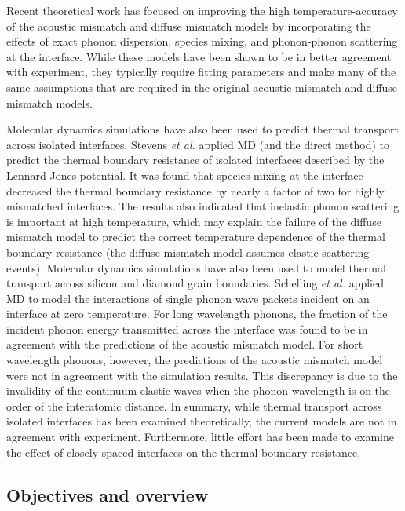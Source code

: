 \documentclass[letterpaper,12pt]{article}
\begin{document}
Recent theoretical work has focused on improving the high
temperature-accuracy of the acoustic mismatch and diffuse mismatch
models by incorporating the effects of exact phonon
dispersion,\cite{reddy2005} species mixing,\cite{beechem2007} and
phonon-phonon scattering\cite{prasher2001} at the interface. While
these models have been shown to be in better agreement with
experiment, they typically require fitting parameters and make many
of the same assumptions that are required in the original acoustic
mismatch and diffuse mismatch models.

Molecular dynamics simulations have also been used to predict
thermal transport across isolated interfaces. Stevens \textit{et
al.}\cite{stevens2007} applied MD (and the direct method) to predict
the thermal boundary resistance of isolated interfaces described by
the Lennard-Jones potential. It was found that species mixing at the
interface decreased the thermal boundary resistance by nearly a
factor of two for highly mismatched interfaces. The results also
indicated that inelastic phonon scattering is important at high
temperature, which may explain the failure of the diffuse mismatch
model to predict the correct temperature dependence of the thermal
boundary resistance (the diffuse mismatch model assumes elastic
scattering events\cite{swartz1989}). Molecular dynamics simulations
have also been used to model thermal transport across
silicon\cite{schelling2004} and diamond\cite{angadi2006} grain
boundaries. Schelling \textit{et al.}\cite{schelling2003} applied MD
to model the interactions of single phonon wave packets incident on
an interface at zero temperature. For long wavelength phonons, the
fraction of the incident phonon energy transmitted across the
interface was found to be in agreement with the predictions of the
acoustic mismatch model. For short wavelength phonons, however, the
predictions of the acoustic mismatch model were not in agreement
with the simulation results. This discrepancy is due to the
invalidity of the continuum elastic waves when the phonon wavelength
is on the order of the interatomic distance. In summary, while
thermal transport across isolated interfaces has been examined
theoretically, the current models are not in agreement with
experiment. Furthermore, little effort has been made to examine the
effect of closely-spaced interfaces on the thermal boundary
resistance.

\clearpage

\subsection{\label{S-Intro-Objectives}Objectives and overview}
\end{document}
